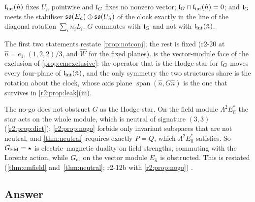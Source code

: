 \begin{proposition}
\label{r2:prop:twoalg}
$\mathfrak l_{\rm int}(\hat n)$ fixes $U_{\hat n}$ pointwise and $\mathfrak l_G$ fixes no nonzero vector; $\mathfrak l_G\cap\mathfrak l_{\rm int}(\hat n)=0$; and $\mathfrak l_G$ meets the stabiliser $\mathfrak{so}(E_{\hat n})\oplus\mathfrak{so}(U_{\hat n})$ of the
clock exactly in the line of the diagonal rotation $\sum_in_iL_i$. $G$ commutes with $\mathfrak l_G$ and not with $\mathfrak l_{\rm int}(\hat n)$.
\end{proposition}

The first two statements restate \cref{prop:notconj}; the rest is fixed (r2-20 at $\hat n=e_1,(1,2,2)/3$, and $\widehat W$ for the fixed planes).
 is the vector-module face of the exclusion of \cref{prop:emexclusive}: the operator that is the Hodge star for $\mathfrak l_G$ moves every
four-plane of $\mathfrak l_{\rm int}(\hat n)$, and the only symmetry the two structures share is the rotation about the clock, whose axis plane $\operatorname{span}(\hat n,G\hat n)$ is the one
that survives in \cref{r2:prop:leak}(iii).

The no-go does not obstruct $G$ as the Hodge star. On the field module $\Lambda^2E_{\hat n}^*$ the star acts on the whole module, which is neutral of signature $(3,3)$
(\cref{r2:prop:dict}); \cref{r2:prop:nogo} forbids only invariant subspaces that are not neutral, and \cref{thm:neutral} requires exactly $P=Q$, which
$\Lambda^2E_{\hat n}^*$ satisfies. So $G_{\rm EM}=\star$ is electric--magnetic duality on field strengths, commuting with the Lorentz action, while $G_{\rm cl}$ on the vector
module $E_{\hat n}$ is obstructed. This is restated (\cref{thm:emfield} and~\cref{thm:neutral}; r2-12b with \cref{r2:prop:nogo}) .

\subsection{Answer}
\label{r2:sec:answer}

